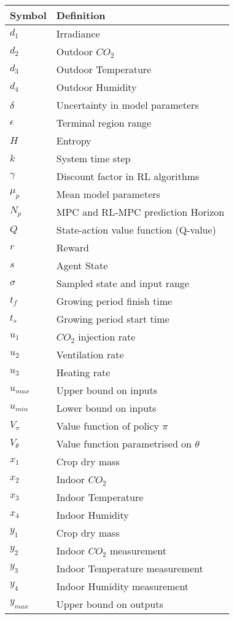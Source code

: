 \begin{longtable}{p{2.5cm}p{8cm}}
	\toprule
	Symbol & Definition \\
	\midrule\endhead %
	$d_1$ & Irradiance \\
	$d_2$ & Outdoor $CO_2$ \\
	$d_3$ & Outdoor Temperature \\
	$d_4$ & Outdoor Humidity \\
	$\delta$& Uncertainty in model parameters \\
	$\epsilon$& Terminal region range \\
	$H$ & Entropy \\
	$k$ & System time step \\
	$\gamma$ & Discount factor in RL algorithms \\
	$\mu_p$& Mean model parameters \\
	$N_p$ & MPC and RL-MPC prediction Horizon \\
	$Q$ & State-action value function (Q-value) \\
	$r$ & Reward \\
	$s$ & Agent State \\
	$\sigma$& Sampled state and input range \\
	$t_f$ & Growing period finish time \\
	$t_s$ & Growing period start time \\
	$u_1$ & $CO_2$ injection rate \\
	$u_2$ & Ventilation rate \\
	$u_3$ & Heating rate \\
	$u_{max}$ & Upper bound on inputs \\
	$u_{min}$ & Lower bound on inputs \\
	$V_{\pi}$ & Value function of policy $\pi$ \\
	$V_{\theta}$ & Value function parametrised on $\theta$ \\
	$x_1$ & Crop dry mass \\
	$x_2$ & Indoor $CO_2$ \\
	$x_3$ & Indoor Temperature \\
	$x_4$ & Indoor Humidity \\
	$y_1$ & Crop dry mass \\
	$y_2$ & Indoor $CO_2$ measurement \\
	$y_3$ & Indoor Temperature measurement \\
	$y_4$ & Indoor Humidity measurement \\
	$y_{max}$ & Upper bound on outputs \\

\end{longtable}
